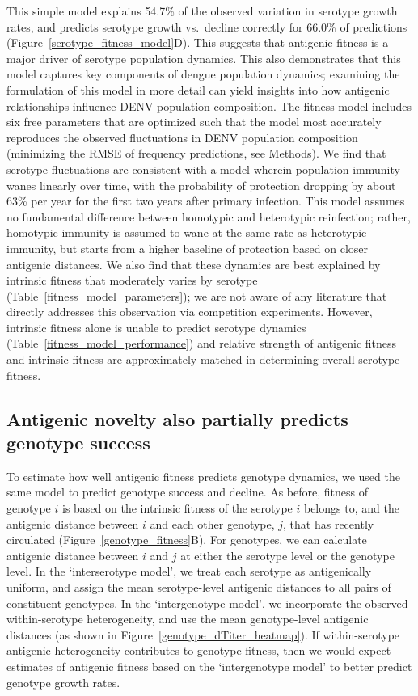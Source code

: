 \documentclass[11pt,oneside,letterpaper]{article}
\begin{document}
This simple model explains 54.7\% of the observed variation in serotype growth rates, and predicts serotype growth vs.\ decline correctly for 66.0\% of predictions (Figure~\ref{serotype_fitness_model}D).
This suggests that antigenic fitness is a major driver of serotype population dynamics.
This also demonstrates that this model captures key components of dengue population dynamics; examining the formulation of this model in more detail can yield insights into how antigenic relationships influence DENV population composition.
The fitness model includes six free parameters that are optimized such that the model most accurately reproduces the observed fluctuations in DENV population composition (minimizing the RMSE of frequency predictions, see Methods).
We find that serotype fluctuations are consistent with a model wherein population immunity wanes linearly over time, with the probability of protection dropping by about 63\% per year for the first two years after primary infection.
This model assumes no fundamental difference between homotypic and heterotypic reinfection; rather, homotypic immunity is assumed to wane at the same rate as heterotypic immunity, but starts from a higher baseline of protection based on closer antigenic distances.
We also find that these dynamics are best explained by intrinsic fitness that moderately varies by serotype (Table~\ref{fitness_model_parameters}); we are not aware of any literature that directly addresses this observation via competition experiments.
However, intrinsic fitness alone is unable to predict serotype dynamics (Table~\ref{fitness_model_performance}) and relative strength of antigenic fitness and intrinsic fitness are approximately matched in determining overall serotype fitness.

\subsection*{Antigenic novelty also partially predicts genotype success}
To estimate how well antigenic fitness predicts genotype dynamics, we used the same model to predict genotype success and decline.
As before, fitness of genotype $i$ is based on the intrinsic fitness of the serotype $i$ belongs to, and the antigenic distance between $i$ and each other genotype, $j$, that has recently circulated (Figure~\ref{genotype_fitness}B).
For genotypes, we can calculate antigenic distance between $i$ and $j$ at either the serotype level or the genotype level.
In the `interserotype model', we treat each serotype as antigenically uniform, and assign the mean serotype-level antigenic distances to all pairs of constituent genotypes.
In the `intergenotype model', we incorporate the observed within-serotype heterogeneity, and use the mean genotype-level antigenic distances (as shown in Figure~\ref{genotype_dTiter_heatmap}).
If within-serotype antigenic heterogeneity contributes to genotype fitness, then we would expect estimates of antigenic fitness based on the `intergenotype model' to better predict genotype growth rates.
\end{document}
